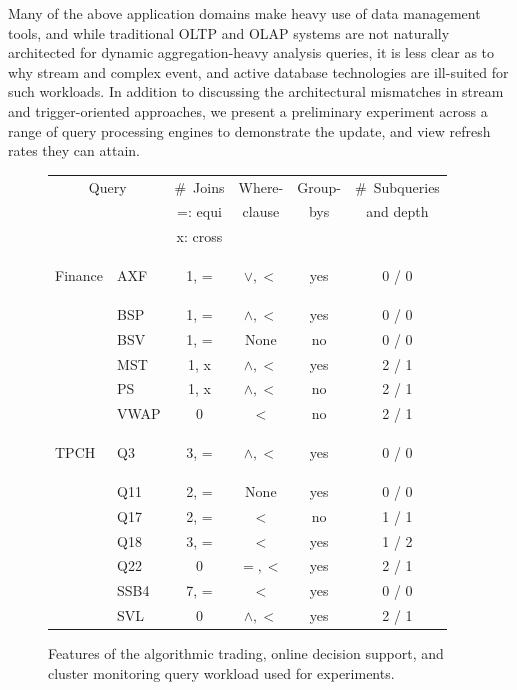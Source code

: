Many of the above application domains make heavy use of data management tools,
and while traditional OLTP and OLAP systems are not naturally architected for
dynamic aggregation-heavy analysis queries, it is less clear as to why stream
and complex event, and active database technologies are ill-suited for such
workloads. In addition to discussing the architectural mismatches in stream and
trigger-oriented approaches, we present a preliminary experiment across a range
of query processing engines to demonstrate the update, and view refresh rates
they can attain.

\begin{figure}[htbp]
\begin{tabular}{ p{0.15cm} | l | c | c | c  | c }
\multicolumn{2}{c|}{Query} & \#~Joins    & Where- & Group- & \#~Subqueries\\
\multicolumn{2}{c|}{}      & =: equi     & clause & bys    & and depth\\
                         & & x: cross    &        &        & \\
\hline
\begin{rotate}{90}\hspace{-1.3cm}Finance\end{rotate}
& AXF        & 1, =      & $\vee, <$     & yes & 0 / 0 \\
& BSP        & 1, =      & $\wedge, <$   & yes & 0 / 0 \\
& BSV        & 1, =      & None          & no  & 0 / 0 \\
& MST        & 1, x      & $\wedge, <$   & yes & 2 / 1 \\
& PS         & 1, x      & $\wedge, <$   & no  & 2 / 1 \\
& VWAP       & 0         & $<$           & no  & 2 / 1 \\
\hline
\begin{rotate}{90}\hspace{-1.4cm}TPCH\end{rotate}
& Q3         & 3, =      & $\wedge, <$   & yes & 0 / 0 \\
& Q11        & 2, =      & None          & yes & 0 / 0 \\
& Q17        & 2, =      & $<$           & no  & 1 / 1 \\
& Q18        & 3, =      & $<$           & yes & 1 / 2 \\
& Q22        & 0         & $=,<$         & yes & 2 / 1 \\
& SSB4       & 7, =      & $<$           & yes & 0 / 0 \\
\hline
& SVL        & 0         & $\wedge, <$   & yes & 2 / 1 \\
\end{tabular}
\caption{Features of the algorithmic trading, online decision support, and
cluster monitoring query workload used for experiments.}
\label{fig:queries}
\end{figure}

